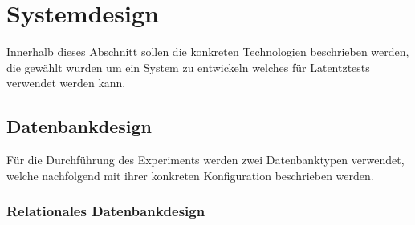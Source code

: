 \chapter{Systemdesign} %
\label{sec:systemdesign}
Innerhalb dieses Abschnitt sollen die konkreten Technologien beschrieben werden, die gewählt wurden um ein System zu entwickeln welches für Latentztests verwendet werden kann.
\section{Datenbankdesign} %
Für die Durchführung des Experiments werden zwei Datenbanktypen verwendet, welche nachfolgend mit ihrer konkreten Konfiguration beschrieben werden.
\label{sec:datenbankdesign}
\subsection{Relationales Datenbankdesign} %
\label{sec:relationalesdatenbankdesign}

